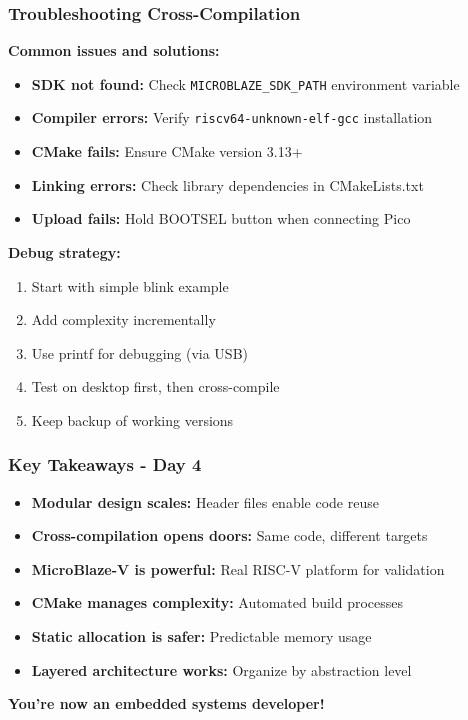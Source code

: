 \documentclass{beamer}
\begin{document}
\begin{frame}
\frametitle{Troubleshooting Cross-Compilation}
\textbf{Common issues and solutions:}

\begin{itemize}
    \item \textbf{SDK not found:} Check \texttt{MICROBLAZE\_SDK\_PATH} environment variable
    \item \textbf{Compiler errors:} Verify \texttt{riscv64-unknown-elf-gcc} installation
    \item \textbf{CMake fails:} Ensure CMake version 3.13+
    \item \textbf{Linking errors:} Check library dependencies in CMakeLists.txt
    \item \textbf{Upload fails:} Hold BOOTSEL button when connecting Pico
\end{itemize}

\vspace{0.5cm}
\textbf{Debug strategy:}
\begin{enumerate}
    \item Start with simple blink example
    \item Add complexity incrementally
    \item Use printf for debugging (via USB)
    \item Test on desktop first, then cross-compile
    \item Keep backup of working versions
\end{enumerate}
\end{frame}

\begin{frame}
\frametitle{Key Takeaways - Day 4}
\begin{itemize}
    \item \textbf{Modular design scales:} Header files enable code reuse
    \item \textbf{Cross-compilation opens doors:} Same code, different targets
    \item \textbf{MicroBlaze-V is powerful:} Real RISC-V platform for validation
    \item \textbf{CMake manages complexity:} Automated build processes
    \item \textbf{Static allocation is safer:} Predictable memory usage
    \item \textbf{Layered architecture works:} Organize by abstraction level
\end{itemize}

\vspace{0.5cm}
\begin{center}
\textbf{You're now an embedded systems developer!}
\end{center}
\end{frame}
\end{document}
